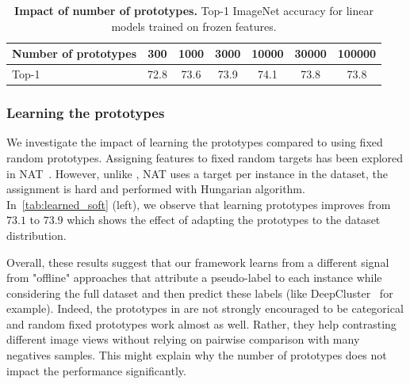 \begin{table}[h]
\centering
  \caption{
\textbf{Impact of number of prototypes.} Top-1 ImageNet accuracy for linear models trained on frozen features.
}
\vspace{.3em}
\begin{tabular}{l c c c c c c}
    \toprule
	  Number of prototypes & 300 & 1000 & 3000 & 10000 & 30000 & 100000 \\
    \midrule
	Top-1 & 72.8 & 73.6 & 73.9 & 74.1 & 73.8 & 73.8 \\
    \bottomrule
  \end{tabular}
  \label{tab:nmbproto}
\end{table}

\subsubsection{Learning the prototypes}
We investigate the impact of learning the prototypes compared to using fixed random prototypes.
Assigning features to fixed random targets has been explored in NAT~\cite{bojanowski2017unsupervised}.
However, unlike \OURS, NAT uses a target per instance in the dataset, the assignment is hard and performed with Hungarian algorithm.
In~\cref{tab:learned_soft} (left), we observe that learning prototypes improves \OURS from $73.1$ to $73.9$ which shows the effect of adapting the prototypes to the dataset distribution.

Overall, these results suggest that our framework learns from a different signal from "offline" approaches that attribute a pseudo-label to each instance while considering the full dataset and then predict these labels (like DeepCluster~\cite{caron2018deep} for example). 
Indeed, the prototypes in \OURS are not strongly encouraged to be categorical and random fixed prototypes work almost as well.
Rather, they help contrasting different image views without relying on pairwise comparison with many negatives samples.
This might explain why the number of prototypes does not impact the performance significantly.

